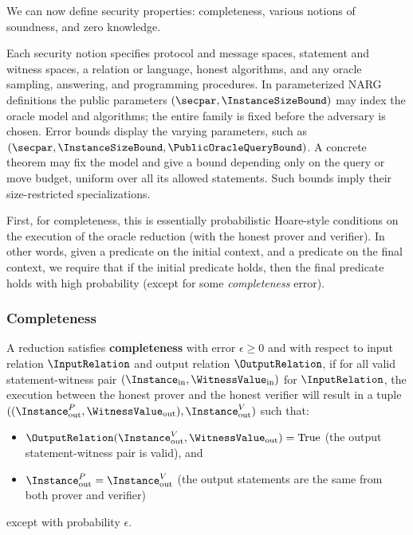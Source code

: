 We can now define security properties: completeness, various notions of soundness, and zero knowledge.

Each security notion specifies protocol and message spaces, statement and witness spaces, a relation or language, honest algorithms, and any oracle sampling, answering, and programming procedures. In parameterized NARG definitions the public parameters \((\secpar,\InstanceSizeBound)\) may index the oracle model and algorithms; the entire family is fixed before the adversary is chosen. Error bounds display the varying parameters, such as \((\secpar,\InstanceSizeBound,\PublicOracleQueryBound)\). A concrete theorem may fix the model and give a bound depending only on the query or move budget, uniform over all its allowed statements. Such bounds imply their size-restricted specializations.

First, for completeness, this is essentially probabilistic Hoare-style conditions on the execution
of the oracle reduction (with the honest prover and verifier). In other words, given a predicate on
the initial context, and a predicate on the final context, we require that if the initial predicate
holds, then the final predicate holds with high probability (except for some \emph{completeness}
error).

\subsubsection{Completeness}

\begin{definition}[Completeness]
    \label{def:completeness}
    A reduction satisfies \textbf{completeness} with error \(\epsilon \geq 0\) and with respect to
    input relation \(\InputRelation\) and output relation \(\OutputRelation\), if for all valid statement-witness pair
    \((\Instance_{\text{in}}, \WitnessValue_{\text{in}})\) for \(\InputRelation\), the execution between the honest prover and the honest verifier
    will result in a tuple \(((\Instance_{\text{out}}^P, \WitnessValue_{\text{out}}), \Instance_{\text{out}}^V)\) such that:
    \begin{itemize}
        \item \(\OutputRelation(\Instance_{\text{out}}^V, \WitnessValue_{\text{out}}) = \text{True}\) (the output statement-witness pair is valid), and
        \item \(\Instance_{\text{out}}^P = \Instance_{\text{out}}^V\) (the output statements are the same from both prover and verifier)
    \end{itemize}
    except with probability \(\epsilon\).
    \leanok
\end{definition}

